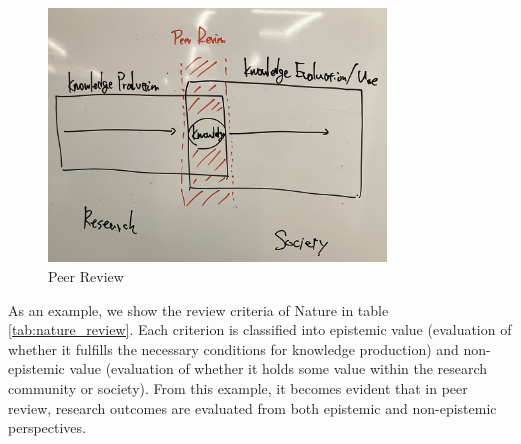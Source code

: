 \documentclass{book}
\begin{document}
\begin{figure}[htb]
    \centering
    \includegraphics[width=0.8\textwidth]{figs/peer_review.jpg}
    \caption{Peer Review}
    \label{fig:peer_review}
\end{figure}

As an example, we show the review criteria of Nature in table \ref{tab:nature_review}. Each criterion is classified into epistemic value (evaluation of whether it fulfills the necessary conditions for knowledge production) and non-epistemic value (evaluation of whether it holds some value within the research community or society). From this example, it becomes evident that in peer review, research outcomes are evaluated from both epistemic and non-epistemic perspectives. 
\end{document}
